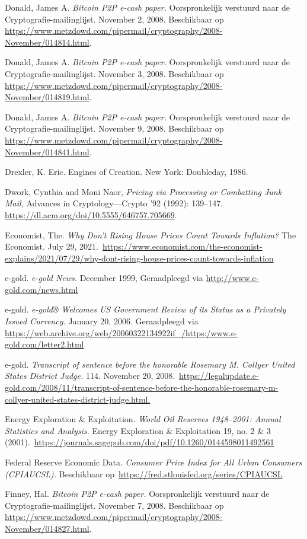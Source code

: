 \documentclass[
  a5paper,
  smalldemyvopaper,11pt,twoside,onecolumn,openright,extrafontsizes,
hidelinks]{memoir}
\begin{document}
{Donald, James A. \emph{Bitcoin P2P e-cash paper.} Oorspronkelijk
verstuurd naar de Cryptografie-mailinglijst. November 2, 2008.
Beschikbaar op
\url{https://www.metzdowd.com/pipermail/cryptography/2008-November/014814.html}.

Donald, James A. \emph{Bitcoin P2P e-cash paper.} Oorspronkelijk
verstuurd naar de Cryptografie-mailinglijst. November 3, 2008.
Beschikbaar op
\url{https://www.metzdowd.com/pipermail/cryptography/2008-November/014819.html}.

Donald, James A. \emph{Bitcoin P2P e-cash paper.} Oorspronkelijk
verstuurd naar de Cryptografie-mailinglijst. November 9, 2008.
Beschikbaar op
\url{https://www.metzdowd.com/pipermail/cryptography/2008-November/014841.html}.

Drexler, K. Eric. Engines of Creation. New York: Doubleday, 1986.

Dwork, Cynthia and Moni Naor, \emph{Pricing via Processing or Combatting
Junk Mail,} Advances in Cryptology---Crypto '92 (1992): 139--147.
\url{https://dl.acm.org/doi/10.5555/646757.705669}.

Economist, The. \emph{Why Don't Rising House Prices Count Towards
Inflation?} The Economist. July 29,
2021.~\url{https://www.economist.com/the-economist-explains/2021/07/29/why-dont-rising-house-prices-count-towards-inflation}

e-gold. \emph{e-gold News.} December 1999, Geraadpleegd via
\url{http://www.e-gold.com/news.html}

e-gold. \emph{e-gold® Welcomes US Government Review of its Status as a
Privately Issued Currency.} January 20, 2006. Geraadpleegd via
\url{https://web.archive.org/web/20060322134922if_/https:/www.e-gold.com/letter2.html}

e-gold. \emph{Transcript of sentence before the honorable Rosemary M.
Collyer United States District Judge.} 114. November 20,
2008.~\url{https://legalupdate.e-gold.com/2008/11/transcript-of-sentence-before-the-honorable-rosemary-m-collyer-united-states-district-judge.html.}

Energy Exploration \& Exploitation. \emph{World Oil Reserves 1948--2001:
Annual Statistics and Analysis.} Energy Exploration \& Exploitation 19,
no. 2 \& 3
(2001).~\url{https://journals.sagepub.com/doi/pdf/10.1260/0144598011492561}

Federal Reserve Economic Data. \emph{Consumer Price Index for All Urban
Consumers (CPIAUCSL).} Beschikbaar
op~\url{https://fred.stlouisfed.org/series/CPIAUCSL}

Finney, Hal. \emph{Bitcoin P2P e-cash paper.} Oorspronkelijk verstuurd
naar de Cryptografie-mailinglijst. November 7, 2008. Beschikbaar op
\url{https://www.metzdowd.com/pipermail/cryptography/2008-November/014827.html}.

}
\end{document}
